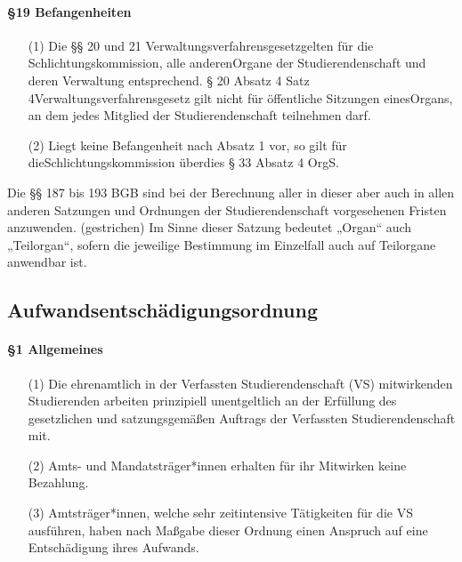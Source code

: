         \paragraph{§19  Befangenheiten}
            \begin{itemize}
                \item[(1)]    Die §§ 20 und 21 Verwaltungsverfahrensgesetzgelten für die Schlichtungskommission, alle anderenOrgane der Studierendenschaft und deren Verwaltung entsprechend. § 20 Absatz 4 Satz 4Verwaltungsverfahrensgesetz gilt nicht für öffentliche Sitzungen einesOrgans, an dem jedes Mitglied der Studierendenschaft teilnehmen darf.
                \item[(2)]    Liegt keine Befangenheit nach Absatz 1 vor, so gilt für dieSchlichtungskommission überdies § 33 Absatz 4 OrgS.
            \end{itemize}
        Die §§ 187 bis 193 BGB sind bei der Berechnung aller in dieser aber auch in allen anderen Satzungen und Ordnungen der Studierendenschaft vorgesehenen Fristen anzuwenden.
            (gestrichen)
        Im Sinne dieser Satzung bedeutet „Organ“ auch „Teilorgan“, sofern die jeweilige Bestimmung im Einzelfall auch auf Teilorgane anwendbar ist.

\subsection{Aufwandsentschädigungsordnung\label{appendix:4}}
    \paragraph{§1 Allgemeines}
        \begin{itemize}
            \item[(1)] Die ehrenamtlich in der Verfassten Studierendenschaft (VS) mitwirkenden Studierenden arbeiten prinzipiell unentgeltlich an der Erfüllung des gesetzlichen und satzungsgemäßen Auftrags der Verfassten Studierendenschaft mit.
            \item[(2)]  Amts- und Mandatsträger*innen erhalten für ihr Mitwirken keine Bezahlung.
            \item[(3)]  Amtsträger*innen, welche sehr zeitintensive Tätigkeiten für die VS ausführen, haben nach Maßgabe dieser Ordnung einen Anspruch auf eine Entschädigung ihres Aufwands.
        \end{itemize}
